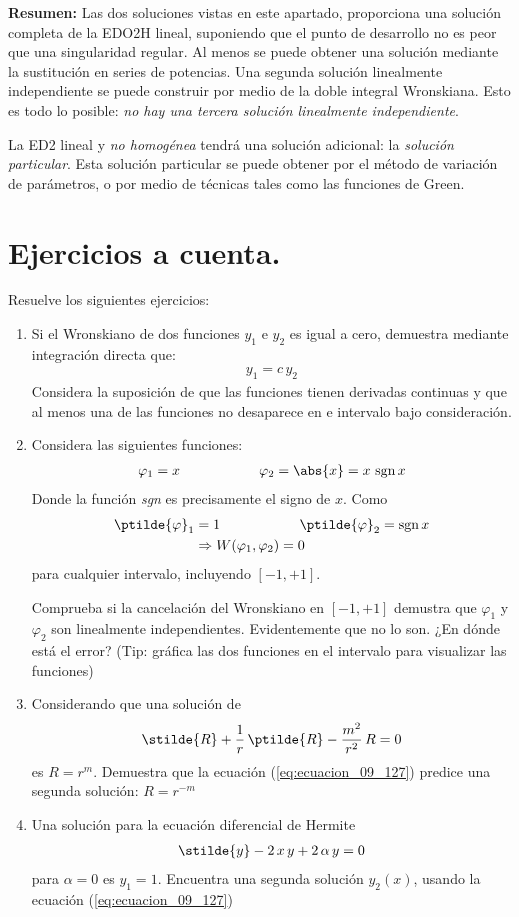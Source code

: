 \par
\textbf{Resumen: } Las dos soluciones vistas en este apartado, proporciona una solución completa de la EDO2H lineal, suponiendo que el punto de desarrollo no es peor que una singularidad regular. Al menos se puede obtener una solución mediante la sustitución en series de potencias. Una segunda solución linealmente independiente se puede construir por medio de la doble integral Wronskiana. Esto es todo lo posible: \emph{no hay una tercera solución linealmente independiente}.
\par
La ED2 lineal y \textit{no homogénea} tendrá una solución adicional: la \emph{solución particular}. Esta solución particular se puede obtener por el método de variación de parámetros, o por medio de técnicas tales como las funciones de Green.
\section{Ejercicios a cuenta.}
Resuelve los siguientes ejercicios:
\begin{enumerate}
\item Si el Wronskiano de dos funciones $y_{1}$ e $y_{2}$ es igual a cero, demuestra mediante integración directa que:
\begin{align*}
y_{1} = c \, y_{2}
\end{align*}
Considera la suposición de que las funciones tienen derivadas continuas y que al menos una de las funciones no desaparece en e intervalo bajo consideración.
\item Considera las siguientes funciones:
\begin{align*}
\varphi_{1} =  x \hspace{2cm} \varphi_{2} = \abs{x} = x \, \, \mbox{sgn} \, x
\end{align*}
Donde la función \textit{sgn} es precisamente el signo de $x$. Como 
\begin{align*}
\ptilde{\varphi}_{1} &=  1 \hspace{2cm} \ptilde{\varphi}_{2} = \mbox{sgn} \, x \\
&\Rightarrow W(\varphi_{1}, \varphi_{2}) = 0
\end{align*}
para cualquier intervalo, incluyendo $[-1, +1]$.
\par
Comprueba si la cancelación del Wronskiano en $[-1, +1]$ demustra que $\varphi_{1}$ y $\varphi_{2}$ son linealmente independientes. Evidentemente que no lo son. ¿En dónde está el error? (Tip: gráfica las dos funciones en el intervalo para visualizar las funciones)
\item Considerando que una solución de
\begin{align*}
\stilde{R} + \dfrac{1}{r} \, \ptilde{R} - \dfrac{m^{2}}{r^{2}} \, R = 0
\end{align*}
es $R = r^{m}$. Demuestra que la ecuación (\ref{eq:ecuacion_09_127}) predice una segunda solución: $R = r^{-m}$
\item Una solución para la ecuación diferencial de Hermite
\begin{align*}
\stilde{y} - 2 \, x \, y + 2 \, \alpha \, y = 0
\end{align*}
para $\alpha = 0$ es $y_{1} = 1$. Encuentra una segunda solución $y_{2}(x)$, usando la ecuación (\ref{eq:ecuacion_09_127})
\end{enumerate}
